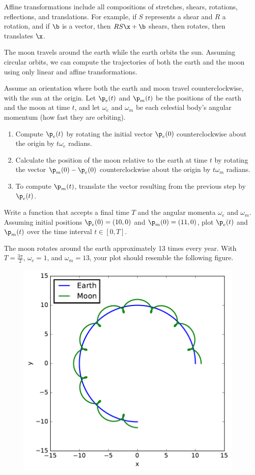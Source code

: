 Affine transformations include all compositions of stretches, shears, rotations, reflections, and translations.
For example, if $S$ represents a shear and $R$ a rotation, and if $\b$ is a vector, then $RS\x + \b$ shears, then rotates, then translates $\x$.

\begin{problem}
The moon travels around the earth while the earth orbits the sun.
Assuming circular orbits, we can compute the trajectories of both the earth and the moon using only linear and affine transformations.

Assume an orientation where both the earth and moon travel counterclockwise, with the sun at the origin.
Let $\p_e(t)$ and $\p_m(t)$ be the positions of the earth and the moon at time $t$, and let $\omega_e$ and $\omega_m$ be each celestial body's angular momentum (how fast they are orbiting).

\begin{enumerate}
\item Compute $\p_e(t)$ by rotating the initial vector $\p_e(0)$ counterclockwise about the origin by $t\omega_e$ radians.
\item Calculate the position of the moon relative to the earth at time $t$ by rotating the vector $\p_m(0) - \p_e(0)$ counterclockwise about the origin by $t\omega_m$ radians.
\item To compute $\p_m(t)$, translate the vector resulting from the previous step by $\p_e(t)$.
\end{enumerate}

Write a function that accepts a final time $T$ and the angular momenta $\omega_e$ and $\omega_m$.
Assuming initial positions $\p_e(0) = (10,0)$ and $\p_m(0) = (11,0)$, plot $\p_e(t)$ and $\p_m(t)$ over the time interval $t \in [0, T]$.

The moon rotates around the earth approximately 13 times every year.
With $T = \frac{3\pi}{2}$, $\omega_e = 1$, and $\omega_m = 13$, your plot should resemble the following figure.
\\
\begin{figure}[H]
    \includegraphics[width=.8\textwidth]{SolarSystem.pdf}
\end{figure}


\end{problem}
